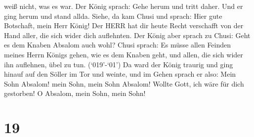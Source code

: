 weiß nicht, was es war.  Der König sprach: Gehe herum und
tritt daher. Und er ging herum und stand allda.  Siehe, da
kam Chusi und sprach: Hier gute Botschaft, mein Herr König! Der HERR hat
dir heute Recht verschafft von der Hand aller, die sich wider dich
auflehnten.  Der König aber sprach zu Chusi: Geht es dem
Knaben Absalom auch wohl? Chusi sprach: Es müsse allen Feinden meines
Herrn Königs gehen, wie es dem Knaben geht, und allen, die sich wider
ihn auflehnen, übel zu tun.  (`019'-`01') Da ward der König
traurig und ging hinauf auf den Söller im Tor und weinte, und im Gehen
sprach er also: Mein Sohn Absalom! mein Sohn, mein Sohn Absalom! Wollte
Gott, ich wäre für dich gestorben! O Absalom, mein Sohn, mein Sohn!

\hypertarget{section-18}{%
\section{19}\label{section-18}}

